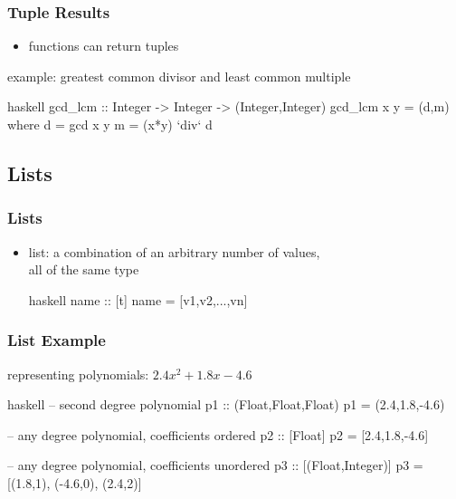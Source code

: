 \documentclass[dvipsnames]{beamer}
\theoremstyle{plain}
\begin{document}
\begin{frame}[fragile]
  \frametitle{Tuple Results}

  \begin{itemize}
    \item functions can return tuples
  \end{itemize}

  \begin{exampleblock}{example: greatest common divisor
                            and least common multiple}
    \begin{pygments}{haskell}
gcd_lcm :: Integer -> Integer -> (Integer,Integer)
gcd_lcm x y = (d,m)
  where d = gcd x y
        m = (x*y) `div` d
    \end{pygments}
  \end{exampleblock}
\end{frame}

\subsection{Lists}

\begin{frame}[fragile]
  \frametitle{Lists}

  \begin{itemize}
    \item \alert{list}: a combination of an arbitrary number of values,\\
      all of the same type
    \begin{block}{}
      \begin{pygments}{haskell}
name :: [t]
name = [v1,v2,...,vn]
      \end{pygments}
    \end{block}
  \end{itemize}
\end{frame}

\begin{frame}[fragile]
  \frametitle{List Example}

  \begin{exampleblock}{representing polynomials: $2.4x^2 + 1.8x - 4.6$}
    \begin{pygments}{haskell}
-- second degree polynomial
p1 :: (Float,Float,Float)
p1 = (2.4,1.8,-4.6)

-- any degree polynomial, coefficients ordered
p2 :: [Float]
p2 = [2.4,1.8,-4.6]

-- any degree polynomial, coefficients unordered
p3 :: [(Float,Integer)]
p3 = [(1.8,1), (-4.6,0), (2.4,2)]
    \end{pygments}
  \end{exampleblock}
\end{frame}
\end{document}
